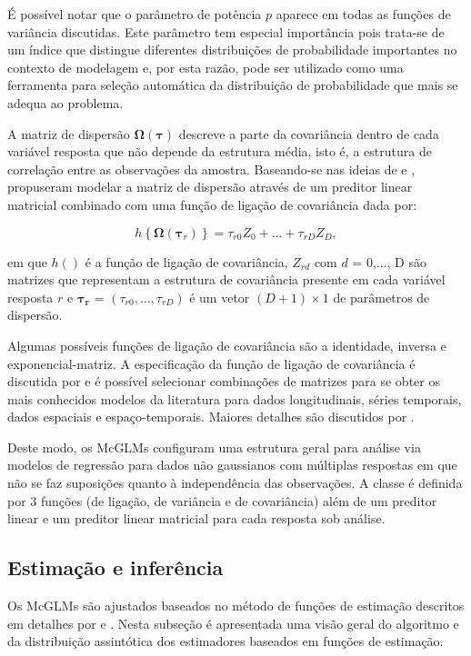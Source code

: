 \documentclass[AMA,STIX1COL]{WileyNJD-v2}
\begin{document}
É possível notar que o parâmetro de potência $p$ aparece em todas as funções de variância discutidas. Este parâmetro tem especial importância pois trata-se de um índice que distingue diferentes distribuições de probabilidade importantes no contexto de modelagem e, por esta razão, pode ser utilizado como uma ferramenta para seleção automática da distribuição de probabilidade que mais se adequa ao problema.

A matriz de dispersão $\boldsymbol{\Omega({\tau})}$ descreve a parte da covariância dentro de cada variável resposta que não depende da estrutura média, isto é, a estrutura de correlação entre as observações da amostra. Baseando-se nas ideias de \cite{Anderson73} e \cite{Pourahmadi00}, \cite{Bonat16} propuseram modelar a matriz de dispersão através de um preditor linear matricial combinado com uma função de ligação de covariância dada por:

$$
h\left \{ \boldsymbol{\Omega}(\boldsymbol{\tau}_r) \right \} = \tau_{r0}Z_0 + \ldots + \tau_{rD}Z_D,
$$

\noindent em que $h()$ é a função de ligação de covariância, $Z_{rd}$ com $d$ = 0,$\ldots$, D são matrizes que representam a estrutura de covariância presente em cada variável resposta $r$ e $\boldsymbol{\tau_r}$ = $(\tau_{r0}, \ldots, \tau_{rD})$ é um vetor $(D + 1) \times 1$ de parâmetros de dispersão. 

Algumas possíveis funções de ligação de covariância são a identidade, inversa e exponencial-matriz. A especificação da função de ligação de covariância é discutida por \cite{Pinheiro96} e é possível selecionar combinações de matrizes para se obter os mais conhecidos modelos da literatura para dados longitudinais, séries temporais, dados espaciais e espaço-temporais. Maiores detalhes são discutidos por \cite{Demidenko13}.

Deste modo, os McGLMs configuram uma estrutura geral para análise via modelos de regressão para dados não gaussianos com múltiplas respostas em que não se faz suposições quanto à independência das observações. A classe é definida por 3 funções (de ligação, de variância e de covariância) além de um preditor linear e um preditor linear matricial para cada resposta sob análise. 

\subsection{Estimação e inferência}

Os McGLMs são ajustados baseados no método de funções de estimação descritos em detalhes por \cite{Bonat16} e \cite{jorg04}. Nesta subseção é apresentada uma visão geral do algoritmo e da distribuição assintótica dos estimadores baseados em funções de estimação.
\end{document}

